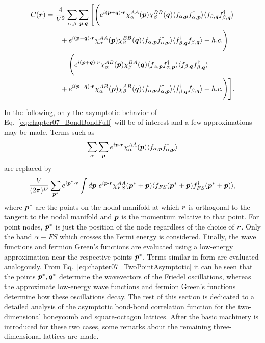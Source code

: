 \begin{align}
	C(\bm{r})	&= \frac{4}{V^2} \sum_{\alpha, \beta} \sum_{\bm{p}, \bm{q}} \Bigg[ \Bigg(e^{i (\bm{p} + \bm{q}) \cdot \bm{r}} \chi_{\alpha}^{AA}(\bm{p}) \chi_{\beta}^{BB}(\bm{q}) \langle f_{\alpha, \bm{p}} f^{\dagger}_{\alpha, \bm{p}} \rangle \langle f_{\beta, \bm{q}} f^{\dagger}_{\beta, \bm{q}} \rangle \nonumber \\
			&\qquad+ e^{i (\bm{p} - \bm{q}) \cdot \bm{r}} \chi_{\alpha}^{AA}(\bm{p}) \chi_{\beta}^{BB}(\bm{q}) \langle f_{\alpha, \bm{p}} f^{\dagger}_{\alpha, \bm{p}} \rangle \langle f^{\dagger}_{\beta, \bm{q}} f_{\beta, \bm{q}} \rangle + h.c. \Bigg) \nonumber \\
			&\qquad- \Bigg(e^{i (\bm{p} + \bm{q}) \cdot \bm{r}} \chi_{\alpha}^{AB}(\bm{p}) \chi_{\beta}^{BA}(\bm{q}) \langle f_{\alpha, \bm{p}} f^{\dagger}_{\alpha, \bm{p}} \rangle \langle f_{\beta, \bm{q}} f^{\dagger}_{\beta, \bm{q}} \rangle \nonumber \\
			&\qquad+ e^{i (\bm{p} - \bm{q}) \cdot \bm{r}} \chi_{\alpha}^{AB}(\bm{p}) \chi_{\beta}^{AB}(\bm{q}) \langle f_{\alpha, \bm{p}} f^{\dagger}_{\alpha, \bm{p}} \rangle \langle f^{\dagger}_{\beta, \bm{q}} f_{\beta, \bm{q}} \rangle + h.c. \Bigg) \Bigg].
	\label{eq:chapter07_BondBondFull}
\end{align}
%

In the following, only the asymptotic behavior of Eq.~\eqref{eq:chapter07_BondBondFull} will be of interest and a few approximations may be made.
Terms such as
%
\begin{equation}
	\sum_{\alpha} \sum_{\bm{p}} e^{i \bm{p} \cdot \bm{r}} \chi_{\alpha}^{AA}(\bm{p}) \langle f_{\alpha, \bm{p}} f^{\dagger}_{\alpha, \bm{p}} \rangle 
\end{equation}
%
are replaced by
%
\begin{equation}
	\frac{V}{(2\pi)^D} \sum_{\bm{p}^*} e^{i \bm{p}^* \cdot \bm{r}} \int d\bm{p}~e^{i \bm{p} \cdot \bm{r}} \chi_{FS}^{AA}(\bm{p}^* + \bm{p}) \langle f_{FS}(\bm{p}^* + \bm{p}) f^{\dagger}_{FS}(\bm{p}^* + \bm{p}) \rangle,
	\label{eq:chapter07_TwoPointAsymptotic}
\end{equation}
%
where $\bm{p}^*$ are the points on the nodal manifold at which $\bm{r}$ is orthogonal to the tangent to the nodal manifold and $\bm{p}$ is the momentum relative to that point.
For point nodes, $\bm{p}^*$ is just the position of the node regardless of the choice of $\bm{r}$.
Only the band $\alpha \equiv FS$ which crosses the Fermi energy is considered.
Finally, the wave functions and fermion Green's functions are evaluated using a low-energy approximation near the respective points $\bm{p}^*$.
Terms similar in form are evaluated analogously.
From Eq.~\eqref{eq:chapter07_TwoPointAsymptotic} it can be seen that the points $\bm{p}^*, \bm{q}^*$ determine the wavevectors of the Friedel oscillations, whereas the approximate low-energy wave functions and fermion Green's functions determine how these oscillations decay.
The rest of this section is dedicated to a detailed analysis of the asymptotic bond-bond correlation function for the two-dimensional honeycomb and square-octagon lattices.
After the basic machinery is introduced for these two cases, some remarks about the remaining three-dimensional lattices are made.


